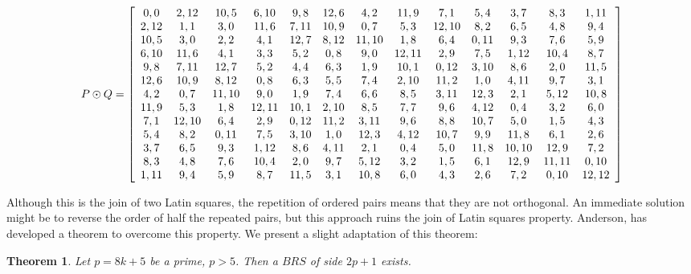 \documentclass[
  11pt,
  a4paper]{book}
\newtheorem{theorem}{Theorem}
\begin{document}
\begin{equation}
  P \odot Q = \left[\begin{array}{*{13}c}
   0,0  & 2,12  & 10,5  & 6,10  & 9,8  & 12,6 &  4,2  & 11,9  &  7,1  & 5,4  &  3,7  &  8,3  & 1,11 \\
   2,12 &  1,1  &  3,0  & 11,6  & 7,11 & 10,9 &  0,7  &  5,3  & 12,10 & 8,2  &  6,5  &  4,8  &  9,4 \\
   10,5 &  3,0  &  2,2  &  4,1  & 12,7 & 8,12 & 11,10 &  1,8  &  6,4  & 0,11 &  9,3  &  7,6  &  5,9 \\
   6,10 & 11,6  &  4,1  &  3,3  & 5,2  & 0,8  &  9,0  & 12,11 &  2,9  & 7,5  & 1,12  & 10,4  &  8,7 \\
   9,8  & 7,11  & 12,7  &  5,2  & 4,4  & 6,3  &  1,9  & 10,1  & 0,12  & 3,10 &  8,6  &  2,0  & 11,5 \\
   12,6 & 10,9  & 8,12  &  0,8  & 6,3  & 5,5  &  7,4  & 2,10  & 11,2  & 1,0  & 4,11  &  9,7  &  3,1 \\
   4,2  &  0,7  & 11,10 &  9,0  & 1,9  & 7,4  &  6,6  &  8,5  & 3,11  & 12,3 &  2,1  & 5,12  & 10,8 \\
   11,9 &  5,3  &  1,8  & 12,11 & 10,1 & 2,10 &  8,5  &  7,7  &  9,6  & 4,12 &  0,4  &  3,2  &  6,0 \\
   7,1  & 12,10 &  6,4  &  2,9  & 0,12 & 11,2 & 3,11  &  9,6  &  8,8  & 10,7 &  5,0  &  1,5  &  4,3 \\
   5,4  &  8,2  & 0,11  &  7,5  & 3,10 & 1,0  & 12,3  & 4,12  & 10,7  & 9,9  & 11,8  &  6,1  &  2,6 \\
   3,7  &  6,5  &  9,3  & 1,12  & 8,6  & 4,11 &  2,1  &  0,4  &  5,0  & 11,8 & 10,10 & 12,9  &  7,2 \\
   8,3  &  4,8  &  7,6  & 10,4  & 2,0  & 9,7  & 5,12  &  3,2  &  1,5  & 6,1  & 12,9  & 11,11 & 0,10 \\
   1,11 &  9,4  &  5,9  &  8,7  & 11,5 & 3,1  & 10,8  &  6,0  &  4,3  & 2,6  &  7,2  & 0,10  & 12,12 \\
  \end{array}\right]
\end{equation}

Although this is the join of two Latin squares, the
repetition of ordered pairs means that they are not
orthogonal. An immediate solution might be to reverse the
order of half the repeated pairs, but this approach ruins
the join of Latin squares property. Anderson, has developed
a theorem to overcome this property. We present a slight
adaptation of this theorem:

\begin{theorem}
Let $p = 8k + 5$ be a prime, $p > 5$. Then a $BRS$ of side
$2p + 1$ exists.
\end{theorem}
\end{document}
